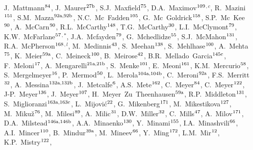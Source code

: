 \begin{flushleft}
J.~Mattmann$^\textrm{\scriptsize 84}$,
J.~Maurer$^\textrm{\scriptsize 27b}$,
S.J.~Maxfield$^\textrm{\scriptsize 75}$,
D.A.~Maximov$^\textrm{\scriptsize 109}$$^{,c}$,
R.~Mazini$^\textrm{\scriptsize 151}$,
S.M.~Mazza$^\textrm{\scriptsize 92a,92b}$,
N.C.~Mc~Fadden$^\textrm{\scriptsize 105}$,
G.~Mc~Goldrick$^\textrm{\scriptsize 158}$,
S.P.~Mc~Kee$^\textrm{\scriptsize 90}$,
A.~McCarn$^\textrm{\scriptsize 90}$,
R.L.~McCarthy$^\textrm{\scriptsize 148}$,
T.G.~McCarthy$^\textrm{\scriptsize 30}$,
L.I.~McClymont$^\textrm{\scriptsize 79}$,
K.W.~McFarlane$^\textrm{\scriptsize 57}$$^{,*}$,
J.A.~Mcfayden$^\textrm{\scriptsize 79}$,
G.~Mchedlidze$^\textrm{\scriptsize 55}$,
S.J.~McMahon$^\textrm{\scriptsize 131}$,
R.A.~McPherson$^\textrm{\scriptsize 168}$$^{,l}$,
M.~Medinnis$^\textrm{\scriptsize 43}$,
S.~Meehan$^\textrm{\scriptsize 138}$,
S.~Mehlhase$^\textrm{\scriptsize 100}$,
A.~Mehta$^\textrm{\scriptsize 75}$,
K.~Meier$^\textrm{\scriptsize 59a}$,
C.~Meineck$^\textrm{\scriptsize 100}$,
B.~Meirose$^\textrm{\scriptsize 42}$,
B.R.~Mellado~Garcia$^\textrm{\scriptsize 145c}$,
F.~Meloni$^\textrm{\scriptsize 17}$,
A.~Mengarelli$^\textrm{\scriptsize 21a,21b}$,
S.~Menke$^\textrm{\scriptsize 101}$,
E.~Meoni$^\textrm{\scriptsize 161}$,
K.M.~Mercurio$^\textrm{\scriptsize 58}$,
S.~Mergelmeyer$^\textrm{\scriptsize 16}$,
P.~Mermod$^\textrm{\scriptsize 50}$,
L.~Merola$^\textrm{\scriptsize 104a,104b}$,
C.~Meroni$^\textrm{\scriptsize 92a}$,
F.S.~Merritt$^\textrm{\scriptsize 32}$,
A.~Messina$^\textrm{\scriptsize 132a,132b}$,
J.~Metcalfe$^\textrm{\scriptsize 6}$,
A.S.~Mete$^\textrm{\scriptsize 162}$,
C.~Meyer$^\textrm{\scriptsize 84}$,
C.~Meyer$^\textrm{\scriptsize 122}$,
J-P.~Meyer$^\textrm{\scriptsize 136}$,
J.~Meyer$^\textrm{\scriptsize 107}$,
H.~Meyer~Zu~Theenhausen$^\textrm{\scriptsize 59a}$,
R.P.~Middleton$^\textrm{\scriptsize 131}$,
S.~Miglioranzi$^\textrm{\scriptsize 163a,163c}$,
L.~Mijovi\'{c}$^\textrm{\scriptsize 22}$,
G.~Mikenberg$^\textrm{\scriptsize 171}$,
M.~Mikestikova$^\textrm{\scriptsize 127}$,
M.~Miku\v{z}$^\textrm{\scriptsize 76}$,
M.~Milesi$^\textrm{\scriptsize 89}$,
A.~Milic$^\textrm{\scriptsize 31}$,
D.W.~Miller$^\textrm{\scriptsize 32}$,
C.~Mills$^\textrm{\scriptsize 47}$,
A.~Milov$^\textrm{\scriptsize 171}$,
D.A.~Milstead$^\textrm{\scriptsize 146a,146b}$,
A.A.~Minaenko$^\textrm{\scriptsize 130}$,
Y.~Minami$^\textrm{\scriptsize 155}$,
I.A.~Minashvili$^\textrm{\scriptsize 66}$,
A.I.~Mincer$^\textrm{\scriptsize 110}$,
B.~Mindur$^\textrm{\scriptsize 39a}$,
M.~Mineev$^\textrm{\scriptsize 66}$,
Y.~Ming$^\textrm{\scriptsize 172}$,
L.M.~Mir$^\textrm{\scriptsize 12}$,
K.P.~Mistry$^\textrm{\scriptsize 122}$,
$$
\end{flushleft}
